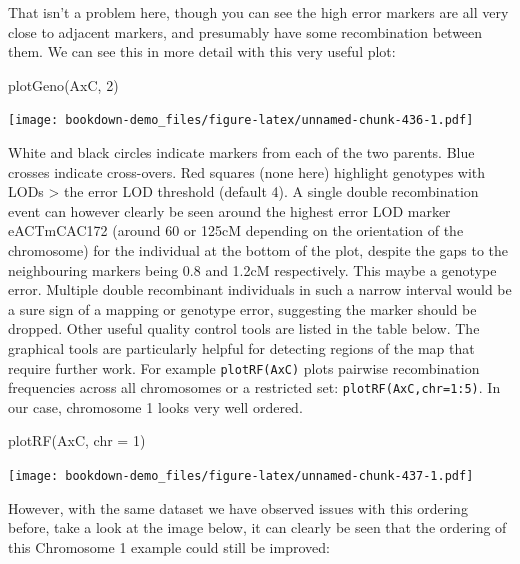 \documentclass[
]{book}
\newenvironment{Shaded}{\begin{snugshade}}{\end{snugshade}}
\newcommand{\AttributeTok}[1]{\textcolor[rgb]{0.77,0.63,0.00}{#1}}
\newcommand{\DecValTok}[1]{\textcolor[rgb]{0.00,0.00,0.81}{#1}}
\newcommand{\FunctionTok}[1]{\textcolor[rgb]{0.00,0.00,0.00}{#1}}
\newcommand{\NormalTok}[1]{#1}
\begin{document}
That isn't a problem here, though you can see the high error markers are all very close to adjacent markers, and presumably have some recombination between them. We can see this in more detail with this very useful plot:

\begin{Shaded}
\begin{Highlighting}[]
\FunctionTok{plotGeno}\NormalTok{(AxC, }\DecValTok{2}\NormalTok{)}
\end{Highlighting}
\end{Shaded}

\texttt{[image: bookdown-demo\_files/figure-latex/unnamed-chunk-436-1.pdf]}

White and black circles indicate markers from each of the two parents. Blue crosses indicate cross-overs. Red squares (none here) highlight genotypes with LODs \textgreater{} the error LOD threshold (default 4). A single double recombination event can however clearly be seen around the highest error LOD marker eACTmCAC172 (around 60 or 125cM depending on the orientation of the chromosome) for the individual at the bottom of the plot, despite the gaps to the neighbouring markers being 0.8 and 1.2cM respectively. This maybe a genotype error. Multiple double recombinant individuals in such a narrow interval would be a sure sign of a mapping or genotype error, suggesting the marker should be dropped.
Other useful quality control tools are listed in the table below. The graphical tools are particularly helpful for detecting regions of the map that require further work. For example \texttt{plotRF(AxC)} plots pairwise recombination frequencies across all chromosomes or a restricted set: \texttt{plotRF(AxC,chr=1:5)}. In our case, chromosome 1 looks very well ordered.

\begin{Shaded}
\begin{Highlighting}[]
\FunctionTok{plotRF}\NormalTok{(AxC, }\AttributeTok{chr =} \DecValTok{1}\NormalTok{)}
\end{Highlighting}
\end{Shaded}

\texttt{[image: bookdown-demo\_files/figure-latex/unnamed-chunk-437-1.pdf]}

However, with the same dataset we have observed issues with this ordering before, take a look at the image below, it can clearly be seen that the ordering of this Chromosome 1 example could still be improved:
\end{document}

